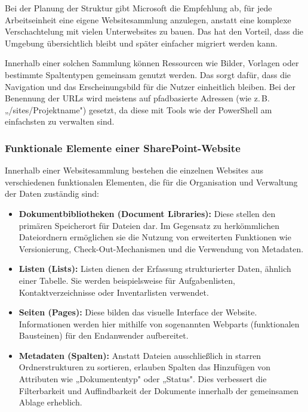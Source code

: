 Bei der Planung der Struktur gibt Microsoft die Empfehlung ab, für jede
Arbeitseinheit eine eigene Websitesammlung anzulegen, anstatt eine komplexe
Verschachtelung mit vielen Unterwebsites zu bauen. Das hat den Vorteil, dass die
Umgebung übersichtlich bleibt und später einfacher migriert werden kann.
\cite{Microsoft2023}

Innerhalb einer solchen Sammlung können Ressourcen wie Bilder, Vorlagen oder
bestimmte Spaltentypen gemeinsam genutzt werden. Das sorgt dafür, dass die
Navigation und das Erscheinungsbild für die Nutzer einheitlich bleiben. Bei der
Benennung der URLs wird meistens auf pfadbasierte Adressen
(wie z.\,B. „/sites/Projektname") gesetzt, da diese mit Tools wie der PowerShell am
einfachsten zu verwalten sind. \cite{Microsoft2023}

\subsubsection{Funktionale Elemente einer SharePoint-Website}

Innerhalb einer Websitesammlung bestehen die einzelnen Websites aus verschiedenen
funktionalen Elementen, die für die Organisation und Verwaltung der Daten zuständig
sind:

\begin{itemize}

    \item \textbf{Dokumentbibliotheken (Document Libraries):}
          Diese stellen den primären Speicherort für Dateien dar. Im Gegensatz zu
          herkömmlichen Dateiordnern ermöglichen sie die Nutzung von erweiterten
          Funktionen wie Versionierung, Check-Out-Mechanismen und die Verwendung
          von Metadaten. \cite{microsoft_sharepoint_support,kampffmeyer2006ecm}

    \item \textbf{Listen (Lists):}
          Listen dienen der Erfassung strukturierter Daten, ähnlich einer Tabelle.
          Sie werden beispielsweise für Aufgabenlisten, Kontaktverzeichnisse oder
          Inventarlisten verwendet. \cite{microsoft_sharepoint_support}

    \item \textbf{Seiten (Pages):}
          Diese bilden das visuelle Interface der Website. Informationen werden hier
          mithilfe von sogenannten Webparts (funktionalen Bausteinen) für den
          Endanwender aufbereitet. \cite{microsoft_sharepoint_support}

    \item \textbf{Metadaten (Spalten):}
          Anstatt Dateien ausschließlich in starren Ordnerstrukturen zu sortieren,
          erlauben Spalten das Hinzufügen von Attributen wie „Dokumententyp" oder
          „Status". Dies verbessert die Filterbarkeit und Auffindbarkeit der
          Dokumente innerhalb der gemeinsamen Ablage erheblich.
          \cite{microsoft_sharepoint_support}

\end{itemize}

